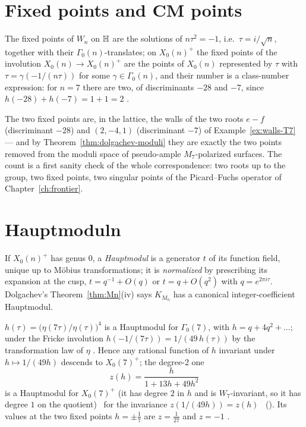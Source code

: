 \section{Fixed points and CM points}

\begin{proposition}
The fixed points of $W_n$ on $\mathbb{H}$ are the solutions of $n\tau^2=-1$, i.e.\
$\tau=i/\sqrt n$, together with their $\Gamma_0(n)$-translates; on $X_0(n)^+$
the fixed points of the involution $X_0(n)\to X_0(n)^+$ are the points of
$X_0(n)$ represented by $\tau$ with $\tau=\gamma(-1/(n\tau))$ for some
$\gamma\in\Gamma_0(n)$, and their number is a class-number expression: for $n=7$
there are two, of discriminants $-28$ and $-7$, since $h(-28)+h(-7)=1+1=2$
\cite{Fricke1911,Ogg1974}.
\end{proposition}

The two fixed points are, in the lattice, the walls of the two roots $e-f$
(discriminant $-28$) and $(2,-4,1)$ (discriminant $-7$) of
Example~\ref{ex:walls-T7} --- and by Theorem~\ref{thm:dolgachev-moduli} they
are exactly the two points removed from the moduli space of pseudo-ample
$M_7$-polarized surfaces. The count is a first sanity check of the whole
correspondence: two roots up to the group, two fixed points, two singular
points of the Picard--Fuchs operator of Chapter~\ref{ch:frontier}.

\section{Hauptmoduln}

\begin{definition}
If $X_0(n)^+$ has genus $0$, a \emph{Hauptmodul} is a generator $t$ of its
function field, unique up to M\"obius transformations; it is \emph{normalized}
by prescribing its expansion at the cusp, $t=q^{-1}+O(q)$ or $t=q+O(q^2)$ with
$q=e^{2\pi i\tau}$. Dolgachev's Theorem~\ref{thm:Mn}(iv) says $K_{M_n}$ has a
canonical integer-coefficient Hauptmodul.
\end{definition}

\begin{example}[$n=7$]\label{ex:haupt7}
$h(\tau)=\bigl(\eta(7\tau)/\eta(\tau)\bigr)^4$ is a Hauptmodul for
$\Gamma_0(7)$, with $h=q+4q^2+\dots$; under the Fricke involution
$h(-1/(7\tau))=1/(49\,h(\tau))$ by the transformation law of $\eta$ \Lstatus.
Hence any rational function of $h$ invariant under $h\mapsto1/(49h)$ descends
to $X_0(7)^+$; the degree-2 one
\[
  z(h)=\frac{h}{1+13h+49h^2}
\]
is a Hauptmodul for $X_0(7)^+$ (it has degree $2$ in $h$ and is $W_7$-invariant,
so it has degree $1$ on the quotient) \Estatus\ for the invariance
$z(1/(49h))=z(h)$ \Kstatus~(\artifact{zOf\_fricke}). Its values at the two
fixed points $h=\pm\tfrac17$ are $z=\tfrac1{27}$ and $z=-1$ \Kstatus.
\end{example}

